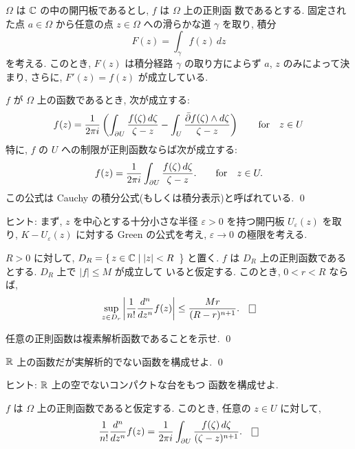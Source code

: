 \documentclass[12pt,twoside]{jarticle}
\begin{document}
\begin{question}[正則函数の不定積分]
  $\Omega$ は ${\mathbb C}$ の中の開円板であるとし, $f$ は $\Omega$ 上の正則函
  数であるとする. 固定された点 $a\in\Omega$ から任意の点 $z\in\Omega$ 
  への滑らかな道 $\gamma$ を取り, 積分
  \[
    F(z) = \int_{\gamma} f(z)\,dz
  \]%
  を考える. このとき, $F(z)$ は積分経路 $\gamma$ の取り方によらず $a$,
  $z$ のみによって決まり, さらに, $F'(z)=f(z)$ が成立している.
\end{question}


\begin{question} 
  $f$ が $\Omega$ 上の函数であるとき, 次が成立する:
  \[
    f(z)
    =
    \frac{1}{2\pi i}
    \left(
      \int_{\partial U} \frac{f(\zeta)\,d\zeta}{\zeta - z}
      -
      \int_U \frac{{\bar\partial} f(\zeta) \wedge d\zeta}{\zeta - z}
    \right)
    \qquad
    \text{for}\quad z\in U
  \]%
  特に, $f$ の $U$ への制限が正則函数ならば次が成立する:
  \[
    f(z)
    =
    \frac{1}{2\pi i}
    \int_{\partial U} \frac{f(\zeta)\,d\zeta}{\zeta - z}.
    \qquad
    \text{for}\quad z\in U.
  \]%
  この公式は Cauchy の積分公式(もしくは積分表示)と呼ばれている. 
  \qed
\end{question}

\noindent ヒント: まず, $z$ を中心とする十分小さな半径 %
$\varepsilon > 0$ を持つ開円板 $U_\varepsilon(z)$ を取り, %
$K - U_\varepsilon(z)$ に対する Green の公式を考え, %
$\varepsilon \to 0$ の極限を考える.

\begin{question}
  $R > 0$ に対して, $D_R = \{\, z\in{\mathbb C} \mid |z| < R$ \,\} と置く. $f$ 
  は $D_R$ 上の正則函数であるとする. $D_R$ 上で $|f|\le M$ が成立して
  いると仮定する. このとき, $0< r < R$ ならば,
  \[
    \sup_{z\in D_r}
      \left| \frac{1}{n!} \frac{d^n}{dz^n} f(z) \right|
    \le
    \frac{M r}{(R - r)^{n+1}}.
  \qed
  \]%
\end{question}


\begin{question}
  任意の正則函数は複素解析函数であることを示せ. \qed
\end{question}


\begin{question}
  ${\mathbb R}$ 上の\Class{\infty}函数だが実解析的でない函数を構成せよ. 
  \qed
\end{question}

\noindent ヒント: ${\mathbb R}$ 上の空でないコンパクトな台をもつ\Class{\infty}
函数を構成せよ. 


\begin{question}
  $f$ は $\Omega$ 上の正則函数であると仮定する. %
  このとき, 任意の $z\in U$ に対して,
  \[
    \frac{1}{n!} \frac{d^n}{dz^n}f(z)
    =
    \frac{1}{2\pi i}
    \int_{\del U} \frac{f(\zeta)\,d\zeta}{(\zeta - z)^{n+1}}.
    \qed
  \]%
\end{question}
\end{document}
